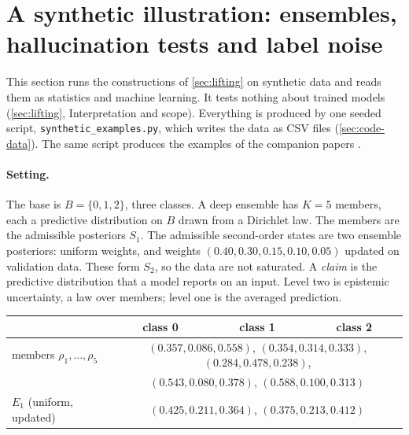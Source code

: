\documentclass[11pt]{article}
\theoremstyle{definition}
\theoremstyle{remark}
\begin{document}
\section{A synthetic illustration: ensembles, hallucination tests and label noise}\label{sec:synthetic}

This section runs the constructions of \cref{sec:lifting} on synthetic data and reads them as statistics and machine
learning. It tests nothing about trained models (\cref{sec:lifting}, Interpretation and scope). Everything is produced by
one seeded script, \texttt{synthetic\_examples.py}, which writes the data as CSV files (\cref{sec:code-data}). The same
script produces the examples of the companion papers \cite{Conditionals,Awasthi-Family}.

\paragraph{Setting.} The base is $B=\{0,1,2\}$, three classes. A deep ensemble has $K=5$ members, each a predictive
distribution on $B$ drawn from a Dirichlet law. The members are the admissible posteriors $S_1$. The admissible
second-order states are two ensemble posteriors: uniform weights, and weights $(0.40,0.30,0.15,0.10,0.05)$ updated
on validation data. These form $S_2$, so the data are not saturated. A \emph{claim} is the predictive distribution
that a model reports on an input. Level two is epistemic uncertainty, a law over members; level one is the averaged
prediction.
\begin{center}\small
\begin{tabular}{@{}lccc@{}}
\toprule
& class 0 & class 1 & class 2\\
\midrule
members $\rho_1,\dots,\rho_5$ & \multicolumn{3}{c}{$(0.357,0.086,0.558)$, $(0.354,0.314,0.333)$, $(0.284,0.478,0.238)$,}\\
& \multicolumn{3}{c}{$(0.543,0.080,0.378)$, $(0.588,0.100,0.313)$}\\
$E_1$ (uniform, updated) & \multicolumn{3}{c}{$(0.425,0.211,0.364)$, \quad $(0.375,0.213,0.412)$}\\
\bottomrule
\end{tabular}
\end{center}
\end{document}
